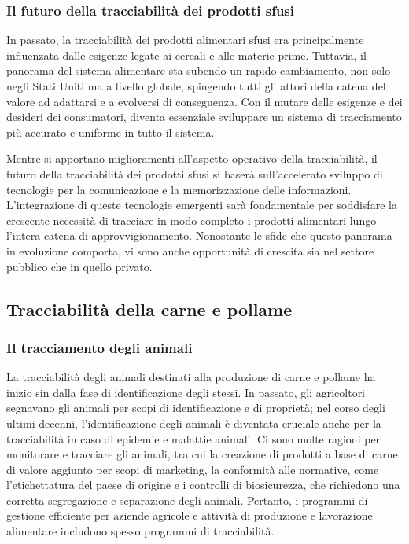 \subsubsection{Il futuro della tracciabilità dei prodotti sfusi}

In passato, la tracciabilità dei prodotti alimentari sfusi era principalmente influenzata dalle esigenze legate ai cereali e alle materie prime. Tuttavia, il panorama del sistema alimentare sta subendo un rapido cambiamento, non solo negli Stati Uniti ma a livello globale, spingendo tutti gli attori della catena del valore ad adattarsi e a evolversi di conseguenza. Con il mutare delle esigenze e dei desideri dei consumatori, diventa essenziale sviluppare un sistema di tracciamento più accurato e uniforme in tutto il sistema.

Mentre si apportano miglioramenti all'aspetto operativo della tracciabilità, il futuro della tracciabilità dei prodotti sfusi si baserà sull'accelerato sviluppo di tecnologie per la comunicazione e la memorizzazione delle informazioni. L'integrazione di queste tecnologie emergenti sarà fondamentale per soddisfare la crescente necessità di tracciare in modo completo i prodotti alimentari lungo l'intera catena di approvvigionamento. Nonostante le sfide che questo panorama in evoluzione comporta, vi sono anche opportunità di crescita sia nel settore pubblico che in quello privato.

\subsection{Tracciabilità della carne e pollame}
\subsubsection{Il tracciamento degli animali}

La tracciabilità degli animali destinati alla produzione di carne e pollame ha inizio sin dalla fase di identificazione degli stessi. In passato, gli agricoltori segnavano gli animali per scopi di identificazione e di proprietà; nel corso degli ultimi decenni, l'identificazione degli animali è diventata cruciale anche per la tracciabilità in caso di epidemie e malattie animali. Ci sono molte ragioni per monitorare e tracciare gli animali, tra cui la creazione di prodotti a base di carne di valore aggiunto per scopi di marketing, la conformità alle normative, come l'etichettatura del paese di origine e i controlli di biosicurezza, che richiedono una corretta segregazione e separazione degli animali. Pertanto, i programmi di gestione efficiente per aziende agricole e attività di produzione e lavorazione alimentare includono spesso programmi di tracciabilità.

